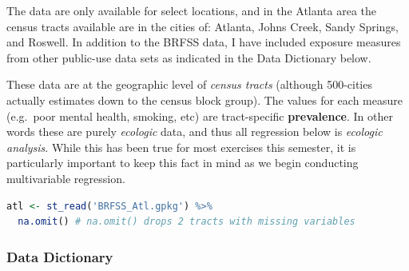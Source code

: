 \documentclass[
]{book}
\begin{document}
The data are only available for select locations, and in the Atlanta area the census tracts available are in the cities of: Atlanta, Johns Creek, Sandy Springs, and Roswell. In addition to the BRFSS data, I have included exposure measures from other public-use data sets as indicated in the Data Dictionary below.

These data are at the geographic level of \emph{census tracts} (although 500-cities actually estimates down to the census block group). The values for each measure (e.g.~poor mental health, smoking, etc) are tract-specific \textbf{prevalence}. In other words these are purely \emph{ecologic} data, and thus all regression below is \emph{ecologic analysis}. While this has been true for most exercises this semester, it is particularly important to keep this fact in mind as we begin conducting multivariable regression.

\begin{lstlisting}[language=R]
atl <- st_read('BRFSS_Atl.gpkg') %>%
  na.omit() # na.omit() drops 2 tracts with missing variables
\end{lstlisting}

\hypertarget{brfss-data}{%
\subsubsection{Data Dictionary}\label{brfss-data}}
\end{document}
